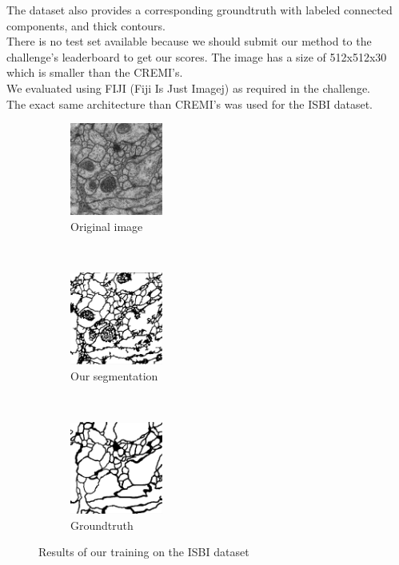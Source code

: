 The dataset also provides a corresponding groundtruth with labeled connected components, and thick contours.\\
There is no test set available because we should submit our method to the challenge's leaderboard to get our scores.
The image has a size of 512x512x30 which is smaller than the CREMI's.\\
We evaluated using FIJI (Fiji Is Just Imagej) as required in the challenge.\\

The exact same architecture than CREMI's was used for the ISBI dataset.\\

\begin{figure}[t!]
    \centering
    \begin{subfigure}[t]{0.5\textwidth}
        \centering
        \includegraphics[height=1.2in]{./images/isbi_orig_1.png}
        \caption{Original image}
    \end{subfigure}%
    ~ 
    \begin{subfigure}[t]{0.5\textwidth}
        \centering
        \includegraphics[height=1.2in]{./images/isbi_out_1.png}
        \caption{Our segmentation}
    \end{subfigure}
    ~ 
    \begin{subfigure}[t]{0.5\textwidth}
        \centering
        \includegraphics[height=1.2in]{./images/isbi_gt_1.png}
        \caption{Groundtruth}
    \end{subfigure}
    \caption{Results of our training on the ISBI dataset}
\end{figure}

